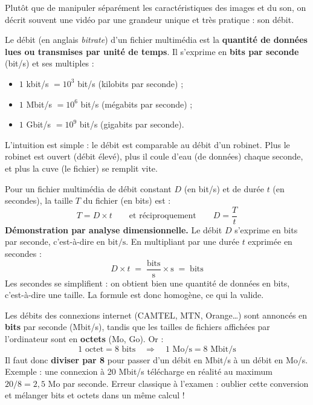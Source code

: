 \documentclass[11pt]{article}
\newcommand{\cle}[1]{{\popxbold\color{popdark}#1}}
\newcounter{popsec}
\newcounter{popsub}
\newcommand{\courssub}[1]{%
  \stepcounter{popsub}%
  \par\vspace{9pt}\noindent{\popxbold\fontsize{11.5}{13}\selectfont\color{popink}{\color{poporange}\thepopsec.\thepopsub}\hspace{6pt}#1}\par\nopagebreak\vspace{4pt}
}
\begin{document}
\courssub{Le débit : une notion centrale}

Plutôt que de manipuler séparément les caractéristiques des images et du son, on décrit souvent une vidéo par une grandeur unique et très pratique : son \cle{débit}.

\begin{definition}
Le \cle{débit} (en anglais \emph{bitrate}) d'un fichier multimédia est la \textbf{quantité de données lues ou transmises par unité de temps}. Il s'exprime en \textbf{bits par seconde} (bit/s) et ses multiples :
\begin{itemize}
  \item $1$ kbit/s $= 10^3$ bit/s (kilobits par seconde) ;
  \item $1$ Mbit/s $= 10^6$ bit/s (mégabits par seconde) ;
  \item $1$ Gbit/s $= 10^9$ bit/s (gigabits par seconde).
\end{itemize}
\end{definition}

L'intuition est simple : le débit est comparable au débit d'un robinet. Plus le robinet est ouvert (débit élevé), plus il coule d'eau (de données) chaque seconde, et plus la cuve (le fichier) se remplit vite.

\begin{propriete}
Pour un fichier multimédia de débit constant $D$ (en bit/s) et de durée $t$ (en secondes), la taille $T$ du fichier (en bits) est :
\[ T = D \times t \qquad \text{et réciproquement} \qquad D = \frac{T}{t} \]
\textbf{Démonstration par analyse dimensionnelle.} Le débit $D$ s'exprime en bits par seconde, c'est-à-dire en $\text{bit}/\text{s}$. En multipliant par une durée $t$ exprimée en secondes :
\[ D \times t \;=\; \frac{\text{bits}}{\text{s}} \times \text{s} \;=\; \text{bits} \]
Les secondes se simplifient : on obtient bien une quantité de données en bits, c'est-à-dire une taille. La formule est donc homogène, ce qui la valide.
\end{propriete}

\begin{attention}
Les débits des connexions internet (CAMTEL, MTN, Orange\ldots) sont annoncés en \textbf{bits} par seconde (Mbit/s), tandis que les tailles de fichiers affichées par l'ordinateur sont en \textbf{octets} (Mo, Go). Or :
\[ 1 \text{ octet} = 8 \text{ bits} \quad \Longrightarrow \quad 1 \text{ Mo/s} = 8 \text{ Mbit/s} \]
Il faut donc \textbf{diviser par 8} pour passer d'un débit en Mbit/s à un débit en Mo/s. Exemple : une connexion à 20 Mbit/s télécharge en réalité au maximum $20 / 8 = {2,5}$ Mo par seconde. Erreur classique à l'examen : oublier cette conversion et mélanger bits et octets dans un même calcul !
\end{attention}
\end{document}
